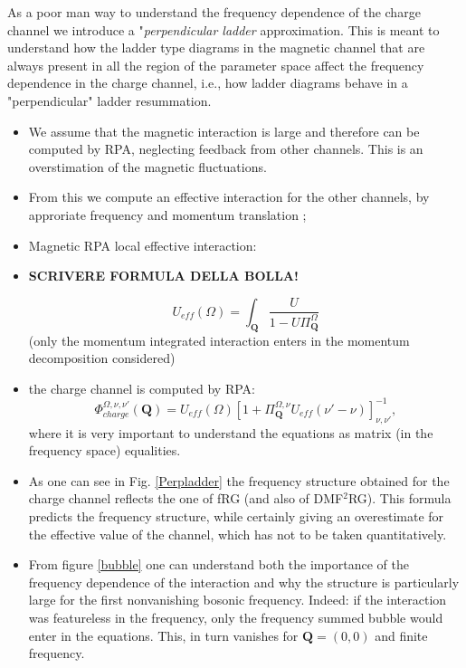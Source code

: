 As a poor man way to understand the frequency dependence of the charge channel we introduce a "\emph{perpendicular ladder} approximation. This is meant to understand how the ladder type diagrams in the magnetic channel that are always present in all the region of the parameter space affect the frequency dependence in the charge channel, i.e., how ladder diagrams behave in a "perpendicular" ladder resummation.

\begin{itemize}
\item We assume that the magnetic interaction is large and therefore can be computed by RPA, neglecting feedback from other channels. This is an overstimation of the magnetic fluctuations. 

\item From this we compute an effective interaction for the other channels, by approriate frequency and momentum translation ; 

\item Magnetic RPA local effective interaction:

\item \textbf{SCRIVERE FORMULA DELLA BOLLA!}

\begin{equation}
  U_{eff}(\Omega) =\int_{\boldsymbol{Q}} \frac{U}{ 1 - U \Pi^{\Omega}_{\boldsymbol{Q}} }
\end{equation}
(only the momentum integrated interaction enters in the momentum decomposition considered)

\item the charge channel is computed by RPA: 
\begin{equation}
  \Phi_{charge}^{\Omega,\nu,\nu'}(\boldsymbol{Q}) = U_{eff}(\Omega) 
  \left[ 1+  \Pi^{\Omega,\nu}_{\boldsymbol{Q}} U_{eff}(\nu'-\nu) \right]_{\nu,\nu'}^{-1},
\end{equation}
where it is very important to understand the equations as matrix (in the frequency space) equalities. 

\item As one can see in Fig. \ref{Perpladder} the frequency structure obtained for the charge channel reflects the one of fRG (and also of DMF$^2$RG). 
This formula predicts the frequency structure, while certainly giving an overestimate for the effective value of the channel, which has not  to be taken quantitatively. 

\item From figure \ref{bubble} one can understand both the importance of the frequency dependence of the interaction and why the structure is particularly large for the first nonvanishing bosonic frequency. 
Indeed: if the interaction was featureless in the frequency, only the frequency summed bubble would enter in the equations. This, in turn vanishes for $\mathbf{Q}=(0,0)$ and finite frequency.  

\end{itemize}

